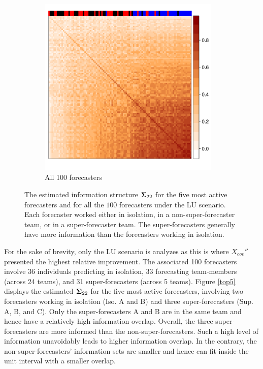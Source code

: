 \documentclass[11pt]{article}
\theoremstyle{definition}
\theoremstyle{definition}
\def\bSigma{{\bf \Sigma}}
\begin{document}
\begin{figure}[t!]
\begin{subfigure}[b]{0.495\textwidth}
                \includegraphics[width=0.95\textwidth]{rightInfoPlot.pdf}
            \caption{All 100 forecasters}
                                \label{top100}
        \end{subfigure}

       
        \caption{The estimated information structure $\bSigma_{22}$ for the five most active forecasters and for all the $100$ forecasters under the LU scenario. Each forecaster worked either in isolation, in a non-super-forecaster team, or in a super-forecaster team. The super-forecasters generally have more information than the forecasters working in isolation.}
        \label{SynthPlot}
\end{figure}


For the sake of brevity, only the LU scenario is analyzes as this is where $X_{cov}''$ presented the highest relative improvement. 
The associated 100 forecasters involve 36 individuals predicting in isolation, 33 forecasting team-members (across 24 teams), and 31 super-forecasters (across 5 teams).  Figure \ref{top5} displays the estimated $\bSigma_{22}$ for the five most active forecasters, involving two forecasters working in isolation (Iso. A and B) and three super-forecasters (Sup. A, B, and C). Only the super-forecasters A and B are in the same team and hence have a relatively high information overlap. Overall, the three super-forecasters are more informed than the non-super-forecasters. Such a high level of information unavoidably leads to higher information overlap. In the contrary, the non-super-forecasters' information sets are smaller and hence  can fit inside the unit interval with a smaller overlap. 
\end{document}

